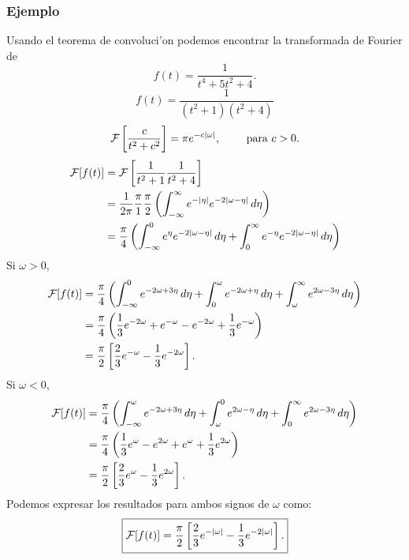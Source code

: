 \subsubsection{Ejemplo} Usando el teorema de convoluci'on podemos encontrar la transformada de Fourier de 
\begin{equation}
 f(t) =\frac{1}{t^4 + 5 t^2 + 4}. 
\end{equation}
\begin{equation}
 f(t) =\frac{1}{(t^2+1)(t^2+4)}
\end{equation}
\begin{equation}
{\cal F}\left[\frac{c}{t^2+c^2}\right] = \pi e^{-c |\omega|},\qquad\text{ para }c > 0. 
\end{equation}
\begin{align}
{\cal F}[f(t)]
 &={\cal F}\left[\frac{1}{t^2+1}\frac{1}{t^2+4}\right] 
\\
 &=\frac{1}{2\pi}\frac{\pi}{1}\frac{\pi}{2}\left(\int_{-\infty}^\infty e^{-|\eta|} e^{-2|\omega -\eta|}\,d\eta\right) 
\\
 &=\frac{\pi}{4}\left(\int_{-\infty}^0 e^\eta e^{-2|\omega -\eta|}\,d\eta
 +\int_0^\infty e^{-\eta} e^{-2|\omega -\eta|}\,d\eta\right)
\end{align}
Si $\omega > 0$,
\begin{align}
{\cal F}[f(t)]
 &=\frac{\pi}{4}\left(\int_{-\infty}^0 e^{-2\omega + 3\eta}\,d\eta
 +\int_0^\omega e^{-2\omega +\eta}\,d\eta
 +\int_\omega^\infty e^{2\omega - 3\eta}\,d\eta\right) 
\\
 &=\frac{\pi}{4}\left(\frac{1}{3} e^{-2\omega} + e^{-\omega}
 - e^{-2\omega} +\frac{1}{3} e^{-\omega}\right) 
\\
 &=\frac{\pi}{2}\left[ \frac{2}{3}e^{-\omega} -\frac{1}{3} e^{-2\omega}\right].
\end{align}
Si $\omega < 0$,
\begin{align}
{\cal F}[f(t)]
 &=\frac{\pi}{4}\left(\int_{-\infty}^\omega e^{-2\omega+3\eta}\,d\eta
 +\int_\omega^0 e^{2\omega -\eta}\,d\eta
 +\int_0^\infty e^{2\omega-3\eta}\,d\eta\right) 
\\
 &=\frac{\pi}{4}\left(\frac{1}{3} e^\omega - e^{2\omega}
 + e^\omega +\frac{1}{3} e^{2\omega}\right)\\
 &=\frac{\pi}{2}\left[\frac{2}{3}e^\omega -\frac{1}{3} e^{2\omega} \right].
\end{align}
Podemos expresar los resultados para ambos signos de $\omega$ como:
\begin{equation}
\boxed{ 
{\cal F}[f(t)] =\frac{\pi}{2}\left[\frac{2}{3} e^{-|\omega|} -\frac{1}{3} e^{-2|\omega|} \right].
 } 
\end{equation} 
